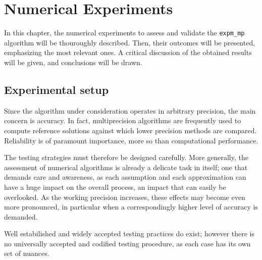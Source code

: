 \chapter{Numerical Experiments}\label{capitolo:6}
In this chapter, the numerical experiments to assess and validate the \texttt{expm\_mp} algorithm will be thouroughly described. Then, their outcomes will be presented, emphasizing the most relevant ones. A critical discussion of the obtained results will be given, and conclusions will be drawn.

\section{Experimental setup}\label{sect:experimental_setup}
Since the algorithm under consideration operates in arbitrary precision, the main concern is accuracy.
In fact, multiprecision algorithms are frequently used to compute reference solutions against which lower precision methods are compared. Reliability is of paramount importance, more so than computational performance.

The testing strategies must therefore be designed carefully. More generally, the assessment of numerical algorithms is already a delicate task in itself; one that demands care and awareness, as each assumption and each approximation can have a huge impact on the overall process, an impact that can easily be overlooked.
As the working precision increases, these effects may become even more pronounced, in particular when a correspondingly higher level of accuracy is demanded. 


Well estabilished and widely accepted testing practices do exist; however there is no universally accepted and codified testing procedure, as each case has its own set of nuances.
\smallskip

